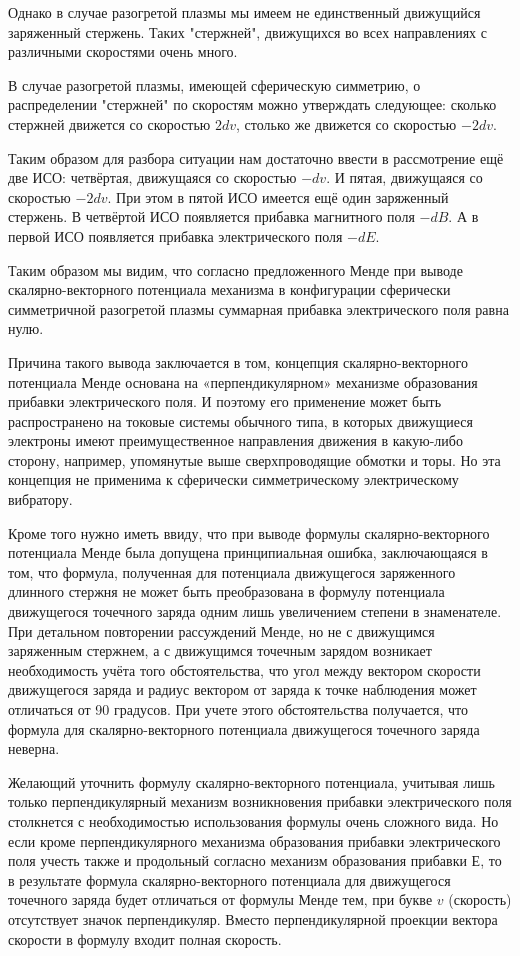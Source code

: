 \documentclass[11pt]{article}
\begin{document}
Однако в случае
разогретой плазмы мы имеем не единственный движущийся заряженный
стержень. Таких "стержней", движущихся во всех направлениях с различными
скоростями очень много.

В случае разогретой плазмы, имеющей сферическую
симметрию, о распределении "стержней" по скоростям можно утверждать
следующее: сколько стержней движется со скоростью \(2dv\), столько же
движется со скоростью \(-2dv\).

Таким образом для разбора ситуации нам
достаточно ввести в рассмотрение ещё две ИСО: четвёртая, движущаяся со
скоростью \(-dv\). И пятая, движущаяся со скоростью \(-2dv\). При этом
в пятой ИСО имеется ещё один заряженный стержень. В четвёртой ИСО
появляется прибавка магнитного поля \(-dB\). А в первой ИСО появляется
прибавка электрического поля \(-dE\).

Таким образом мы видим, что
согласно предложенного Менде при выводе скалярно-векторного потенциала
механизма в конфигурации сферически симметричной разогретой плазмы
суммарная прибавка электрического поля равна нулю.

Причина такого вывода
заключается в том, концепция скалярно-векторного потенциала Менде
основана на «перпендикулярном» механизме образования прибавки
электрического поля. И поэтому его применение может быть распространено
на токовые системы обычного типа, в которых движущиеся электроны имеют
преимущественное направления движения в какую-либо сторону, например,
упомянутые выше сверхпроводящие обмотки и торы. Но эта концепция не
применима к сферически симметрическому электрическому вибратору.


Кроме того нужно иметь ввиду, что при выводе формулы скалярно-векторного
потенциала Менде была допущена принципиальная ошибка, заключающаяся в
том, что формула, полученная для потенциала движущегося заряженного
длинного стержня не может быть преобразована в формулу потенциала
движущегося точечного заряда одним лишь увеличением степени в
знаменателе. При детальном повторении рассуждений Менде, но не с
движущимся заряженным стержнем, а с движущимся точечным зарядом
возникает необходимость учёта того обстоятельства, что угол между
вектором скорости движущегося заряда и радиус вектором от заряда к точке
наблюдения может отличаться от 90 градусов. При учете этого
обстоятельства получается, что формула для скалярно-векторного
потенциала движущегося точечного заряда неверна.

Желающий уточнить формулу скалярно-векторного потенциала, учитывая лишь только
перпендикулярный механизм возникновения прибавки электрического поля
столкнется с необходимостью использования формулы очень сложного вида.
Но если кроме перпендикулярного механизма образования прибавки
электрического поля учесть также и продольный согласно \cite{Nikolaev2004} механизм
образования прибавки Е, то в результате формула
скалярно-векторного потенциала для движущегося точечного заряда будет
отличаться от формулы Менде тем, при букве \(v\) (скорость) отсутствует
значок перпендикуляр. Вместо перпендикулярной проекции вектора скорости
в формулу входит полная скорость.
\end{document}
